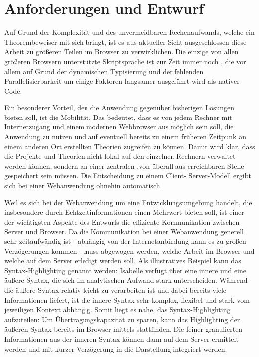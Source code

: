 \chapter{Anforderungen und Entwurf}
\label{sec:draft}

Auf Grund der Komplexität und des unvermeidbaren Rechenaufwands, welche ein Theorembeweiser mit sich
bringt, ist es aus aktueller Sicht ausgeschlossen diese Arbeit zu größeren Teilen im Browser zu
verwirklichen. Die einzige von allen größeren Browsern unterstützte Skriptsprache ist zur Zeit immer
noch , die vor allem auf Grund der dynamischen Typisierung und der fehlenden
Parallelisierbarkeit um einige Faktoren langsamer ausgeführt wird als nativer Code.

Ein besonderer Vorteil, den die Anwendung gegenüber bisherigen Lösungen bieten soll, ist die
Mobilität. Das bedeutet, dass es von jedem Rechner mit Internetzugang und einem modernen Webbrowser
aus möglich sein soll, die Anwendung zu nutzen und auf eventuell bereits zu einem früheren Zeitpunk
an einem anderen Ort erstellten Theorien zugreifen zu können. Damit wird klar, dass die Projekte und
Theorien nicht lokal auf den einzelnen Rechnern verwaltet werden können, sondern an einer zentralen
,von überall aus erreichbaren Stelle gespeichert sein müssen. Die Entscheidung zu einem Client-
Server-Modell ergibt sich bei einer Webanwendung ohnehin automatisch.

Weil es sich bei der Webanwendung um eine Entwicklungsumgebung handelt, die insbesondere durch
Echtzeitinformationen einen Mehrwert bieten soll, ist einer der wichtigsten Aspekte des Entwurfs die
effiziente Kommunikation zwischen Server und Browser. Da die Kommunikation bei einer Webanwendung
generell sehr zeitaufwändig ist - abhängig von der Internetanbindung kann es zu großen Verzögerungen
kommen - muss abgewogen werden, welche Arbeit im Browser und welche auf dem Server erledigt werden
soll. Als illustratives Beispiel kann das Syntax-Highlighting genannt werden: Isabelle verfügt über
eine innere und eine äußere Syntax, die sich im analytischen Aufwand stark unterscheiden. Während
die äußere Syntax relativ leicht zu verarbeiten ist und dabei bereits viele Informationen liefert,
ist die innere Syntax sehr komplex, flexibel und stark vom jeweiligen Kontext abhängig. Somit liegt
es nahe, das Syntax-Highlighting aufzuteilen: Um Übertragungskapazität zu sparen, kann das
Highlighting der äußeren Syntax bereits im Browser mittels  stattfinden. Die feiner
granulierten Informationen aus der inneren Syntax können dann auf dem Server ermittelt werden und
mit kurzer Verzögerung in die Darstellung integriert werden.



\clearpage



\clearpage

